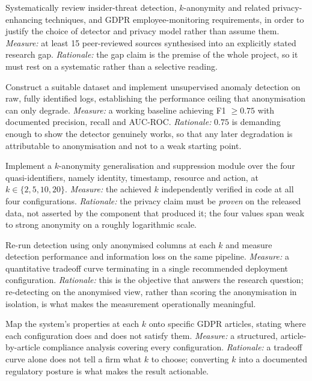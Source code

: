 \documentclass[10pt,a4paper]{article}
\begin{document}
\begin{description}[leftmargin=1.6em,style=nextline]
\item[O1, Literature review.] Systematically review insider-threat detection, $k$-anonymity and related privacy-enhancing techniques, and GDPR employee-monitoring requirements, in order to justify the choice of detector and privacy model rather than assume them. \textit{Measure:} at least 15 peer-reviewed sources synthesised into an explicitly stated research gap. \textit{Rationale:} the gap claim is the premise of the whole project, so it must rest on a systematic rather than a selective reading.
\item[O2, Baseline detection pipeline.] Construct a suitable dataset and implement unsupervised anomaly detection on raw, fully identified logs, establishing the performance ceiling that anonymisation can only degrade. \textit{Measure:} a working baseline achieving F1 $\ge 0.75$ with documented precision, recall and AUC-ROC. \textit{Rationale:} $0.75$ is demanding enough to show the detector genuinely works, so that any later degradation is attributable to anonymisation and not to a weak starting point.
\item[O3, Anonymisation system.] Implement a $k$-anonymity generalisation and suppression module over the four quasi-identifiers, namely identity, timestamp, resource and action, at $k\in\{2,5,10,20\}$. \textit{Measure:} the achieved $k$ independently verified in code at all four configurations. \textit{Rationale:} the privacy claim must be \emph{proven} on the released data, not asserted by the component that produced it; the four values span weak to strong anonymity on a roughly logarithmic scale.
\item[O4, Privacy and utility tradeoff.] Re-run detection using only anonymised columns at each $k$ and measure detection performance and information loss on the same pipeline. \textit{Measure:} a quantitative tradeoff curve terminating in a single recommended deployment configuration. \textit{Rationale:} this is the objective that answers the research question; re-detecting on the anonymised view, rather than scoring the anonymisation in isolation, is what makes the measurement operationally meaningful.
\item[O5, GDPR compliance assessment.] Map the system's properties at each $k$ onto specific GDPR articles, stating where each configuration does and does not satisfy them. \textit{Measure:} a structured, article-by-article compliance analysis covering every configuration. \textit{Rationale:} a tradeoff curve alone does not tell a firm what $k$ to choose; converting $k$ into a documented regulatory posture is what makes the result actionable.
\end{description}
\end{document}
